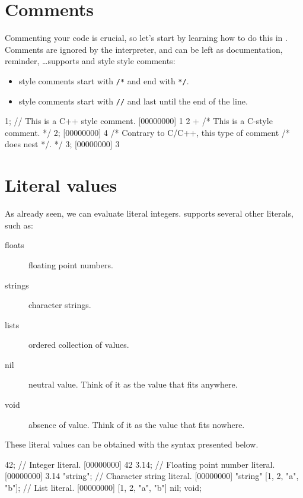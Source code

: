 \section{Comments}

Commenting your code is crucial, so let's start by learning how to do
this in \us. Comments are ignored by the interpreter, and
can be left as documentation, reminder, \ldots \us supports \C and
\Cxx style style comments:

\begin{itemize}
\item \C style comments start with \texttt{/*} and end with \texttt{*/}.
\item \Cxx style comments start with \texttt{//} and last until the
  end of the line.
\end{itemize}


\begin{urbiscript}
1; // This is a C++ style comment.
[00000000] 1
2 + /* This is a C-style comment. */ 2;
[00000000] 4
/* Contrary to C/C++, this type of comment /* does nest */. */
3;
[00000000] 3
\end{urbiscript}


\section{Literal values}

As already seen, we can evaluate literal integers. \us supports
several other literals, such as:

\begin{description}
\item[floats] floating point numbers.
\item[strings] character strings.
\item[lists] ordered collection of values.
\item[nil] neutral value. Think of it as the value that fits anywhere.
\item[void] absence of value. Think of it as the value that fits nowhere.
\end{description}

These literal values can be obtained with the syntax presented below.

\begin{urbiscript}
42; // Integer literal.
[00000000] 42
3.14; // Floating point number literal.
[00000000] 3.14
"string"; // Character string literal.
[00000000] "string"
[1, 2, "a", "b"]; // List literal.
[00000000] [1, 2, "a", "b"]
nil;
void;
\end{urbiscript}

